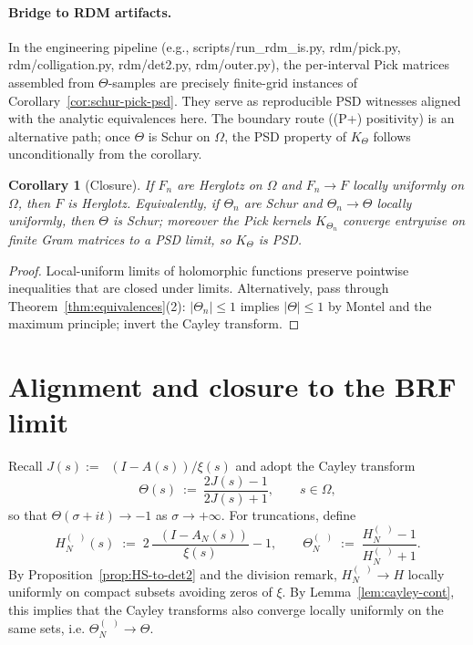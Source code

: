 \documentclass[11pt]{article}
\newtheorem{corollary}[theorem]{Corollary}
\theoremstyle{definition}
\theoremstyle{remark}
\DeclareMathOperator{\dettwo}{det_2}
\begin{document}
\paragraph{Bridge to RDM artifacts.}
In the engineering pipeline (e.g., scripts/run\_rdm\_is.py, rdm/pick.py, rdm/colligation.py, rdm/det2.py, rdm/outer.py), the per-interval Pick matrices assembled from \(\Theta\)-samples are precisely finite-grid instances of Corollary~\ref{cor:schur-pick-psd}. They serve as reproducible PSD witnesses aligned with the analytic equivalences here. The boundary route ((P+) positivity) is an alternative path; once \(\Theta\) is Schur on \(\Omega\), the PSD property of \(K_\Theta\) follows unconditionally from the corollary.

\begin{corollary}[Closure]\label{cor:closure}
If \(F_n\) are Herglotz on \(\Omega\) and \(F_n\to F\) locally uniformly on \(\Omega\), then \(F\) is Herglotz. Equivalently, if \(\Theta_n\) are Schur and \(\Theta_n\to\Theta\) locally uniformly, then \(\Theta\) is Schur; moreover the Pick kernels \(K_{\Theta_n}\) converge entrywise on finite Gram matrices to a PSD limit, so \(K_{\Theta}\) is PSD.
\end{corollary}
\begin{proof}
Local-uniform limits of holomorphic functions preserve pointwise inequalities that are closed under limits. Alternatively, pass through Theorem~\ref{thm:equivalences}(2): \(|\Theta_n|\le 1\) implies \(|\Theta|\le 1\) by Montel and the maximum principle; invert the Cayley transform.
\end{proof}

\section{Alignment and closure to the BRF limit}\label{sec:alignment}
Recall \(J(s):=\dettwo(I-A(s))/\xi(s)\) and adopt the Cayley transform
\[
  \Theta(s)\ :=\ \frac{2J(s)-1}{2J(s)+1},\qquad s\in\Omega,
\]
so that \(\Theta(\sigma+it)\to -1\) as \(\sigma\to+\infty\). For truncations, define
\[
 H_N^{(\dettwo)}(s)\;:=\;2\,\frac{\dettwo(I-A_N(s))}{\xi(s)}-1,\qquad \Theta_N^{(\dettwo)}\;:=\;\frac{H_N^{(\dettwo)}-1}{H_N^{(\dettwo)}+1}.
\]
By Proposition~\ref{prop:HS-to-det2} and the division remark, \(H_N^{(\dettwo)}\to H\) locally uniformly on compact subsets avoiding zeros of \(\xi\). By Lemma~\ref{lem:cayley-cont}, this implies that the Cayley transforms also converge locally uniformly on the same sets, i.e. \(\Theta_N^{(\dettwo)}\to\Theta\).
\end{document}
